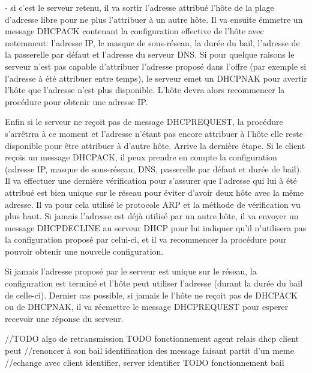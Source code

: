 \item- si c'est le serveur retenu, il va sortir l'adresse attribué l'hôte de la
plage d'adresse libre pour ne plus l'attribuer à un autre hôte. Il va ensuite
émmetre un message DHCPACK contenant la configuration effective de l'hôte avec
notemment: l'adresse IP, le masque de sous-réseau, la durée du bail, l'adresse
de la passerelle par défaut et l'adresse du serveur DNS.  Si pour quelque
raisons le serveur n'est pas capable d'attribuer l'adresse proposé dans l'offre
(par exemple si l'adresse à été attribuer entre temps), le serveur emet un
DHCPNAK pour avertir l'hôte que l'adresse n'est plus disponible. L'hôte devra
alors recommencer la procédure pour obtenir une adresse IP.

Enfin si le serveur ne reçoit pas de message DHCPREQUEST, la procédure
s'arrêtrra à ce moment et l'adresse n'étant pas encore attribuer à l'hôte elle
reste disponible pour être attribuer à d'autre hôte.  Arrive la dernière étape.
Si le client reçois un message DHCPACK, il peux prendre en compte la
configuration (adresse IP, masque de sous-réseau, DNS, passerelle par défaut et
durée de bail). Il va effectuer une dernière vérification pour s'assurer que
l'adresse qui lui à été attribué est bien unique sur le réseau pour éviter
d'avoir deux hôte avec la même adresse. Il va pour cela utilisé le protocole
ARP et la méthode de vérification vu plus haut. Si jamais l'adresse est déjà
utilisé par un autre hôte, il va envoyer un message DHCPDECLINE au serveur DHCP
pour lui indiquer qu'il n'utilisera pas la configuration proposé par celui-ci,
et il va recommencer la procédure pour pouvoir obtenir une nouvelle
configuration.

Si jamais l'adresse proposé par le serveur est unique sur le réseau, la
configuration est terminé et l'hôte peut utiliser l'adresse (durant la durée du
bail de celle-ci).  Dernier cas possible, si jamais le l'hôte ne reçoit pas de
DHCPACK ou de DHCPNAK, il va réemettre le message DHCPREQUEST pour esperer
recevoir une réponse du serveur.

//TODO algo de retransmission TODO fonctionnement agent relais dhcp client peut
//renoncer à son bail identification des message faisant partit d'un meme
//echange avec client identifier, server identifier TODO fonctionnement bail

